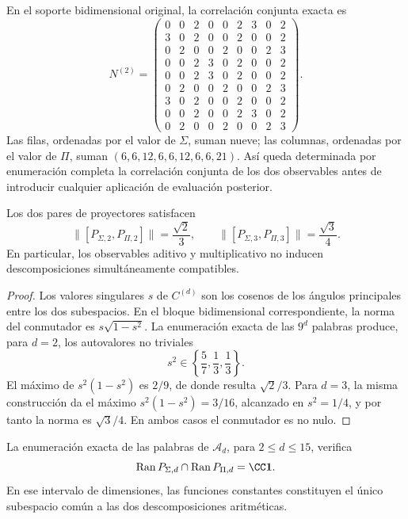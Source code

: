 En el soporte bidimensional original, la correlación conjunta exacta es
\[
N^{(2)}=
\begin{pmatrix}
0&0&2&0&0&2&3&0&2\\
3&0&2&0&0&2&0&0&2\\
0&2&0&0&2&0&0&2&3\\
0&0&2&3&0&2&0&0&2\\
0&0&2&3&0&2&0&0&2\\
0&2&0&0&2&0&0&2&3\\
3&0&2&0&0&2&0&0&2\\
0&0&2&0&0&2&3&0&2\\
0&2&0&0&2&0&0&2&3
\end{pmatrix}.
\]
Las filas, ordenadas por el valor de \(\Sigma\), suman nueve; las columnas,
ordenadas por el valor de \(\Pi\), suman
\((6,6,12,6,6,12,6,6,21)\). Así queda determinada por enumeración completa
la correlación conjunta de los dos observables antes de introducir cualquier
aplicación de evaluación posterior.

\begin{proposition}
\label{prop:app-no-conmutatividad}
Los dos pares de proyectores satisfacen
\[
 \|[P_{\Sigma,2},P_{\Pi,2}]\|=\frac{\sqrt2}{3},
 \qquad
 \|[P_{\Sigma,3},P_{\Pi,3}]\|=\frac{\sqrt3}{4}.
\]
En particular, los observables aditivo y multiplicativo no inducen
descomposiciones simultáneamente compatibles.
\end{proposition}

\begin{proof}
Los valores singulares \(s\) de \(C^{(d)}\) son los cosenos de los ángulos
principales entre los dos subespacios. En el bloque bidimensional
correspondiente, la norma del conmutador es \(s\sqrt{1-s^2}\). La enumeración
exacta de las \(9^d\) palabras produce, para \(d=2\), los autovalores no
triviales
\[
 s^2\in\left\{\frac57,\frac13,\frac13\right\}.
\]
El máximo de \(s^2(1-s^2)\) es \(2/9\), de donde resulta
\(\sqrt2/3\). Para \(d=3\), la misma construcción da el máximo
\(s^2(1-s^2)=3/16\), alcanzado en \(s^2=1/4\), y por tanto la norma es
\(\sqrt3/4\). En ambos casos el conmutador es no nulo.
\end{proof}

\begin{proposition}
\label{prop:app-interseccion-proyectores}
La enumeración exacta de las palabras de \(\mathscr A_d\), para
\(2\leq d\leq15\), verifica
\[
 \operatorname{Ran}P_{\Sigma,d}\cap
 \operatorname{Ran}P_{\Pi,d}
 =\CC\mathbf 1.
\]
En ese intervalo de dimensiones, las funciones constantes constituyen el
único subespacio común a las dos descomposiciones aritméticas.
\end{proposition}

